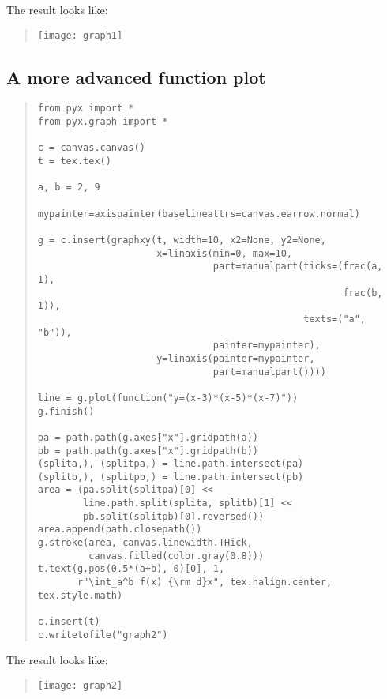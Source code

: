 The result looks like:
\begin{quote}
\texttt{[image: graph1]}
\end{quote}

\subsection{A more advanced function plot}

\begin{quote}
\begin{verbatim}
from pyx import *
from pyx.graph import *

c = canvas.canvas()
t = tex.tex()

a, b = 2, 9

mypainter=axispainter(baselineattrs=canvas.earrow.normal)

g = c.insert(graphxy(t, width=10, x2=None, y2=None,
                     x=linaxis(min=0, max=10,
                               part=manualpart(ticks=(frac(a, 1),
                                                      frac(b, 1)),
                                               texts=("a", "b")),
                               painter=mypainter),
                     y=linaxis(painter=mypainter,
                               part=manualpart())))

line = g.plot(function("y=(x-3)*(x-5)*(x-7)"))
g.finish()

pa = path.path(g.axes["x"].gridpath(a))
pb = path.path(g.axes["x"].gridpath(b))
(splita,), (splitpa,) = line.path.intersect(pa)
(splitb,), (splitpb,) = line.path.intersect(pb)
area = (pa.split(splitpa)[0] <<
        line.path.split(splita, splitb)[1] <<
        pb.split(splitpb)[0].reversed())
area.append(path.closepath())
g.stroke(area, canvas.linewidth.THick,
         canvas.filled(color.gray(0.8)))
t.text(g.pos(0.5*(a+b), 0)[0], 1,
       r"\int_a^b f(x) {\rm d}x", tex.halign.center, tex.style.math)

c.insert(t)
c.writetofile("graph2")
\end{verbatim}
\end{quote}

The result looks like:
\begin{quote}
\texttt{[image: graph2]}
\end{quote}


